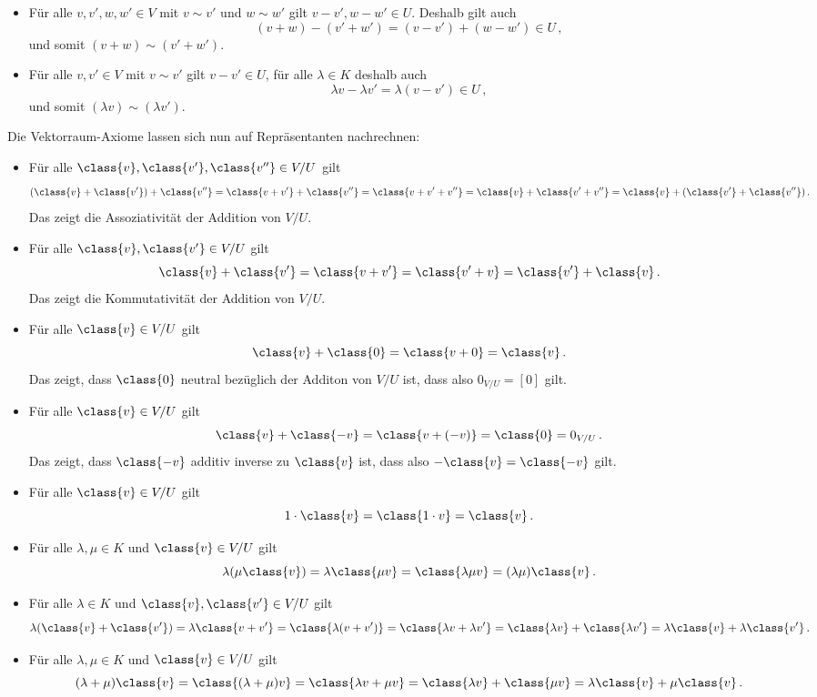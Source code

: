 \begin{itemize}
  \item
    Für alle $v, v', w, w' \in V$ mit $v \sim v'$ und $w \sim w'$ gilt $v - v', w - w' \in U$.
    Deshalb gilt auch
    \[
          (v + w) - (v' + w')
      =   (v - v') + (w - w')
      \in U \,,
    \]
    und somit $(v + w) \sim (v' + w')$.
  \item
    Für alle $v, v' \in V$ mit $v \sim v'$ gilt $v - v' \in U$, für alle $\lambda \in K$ deshalb auch
    \[
          \lambda v - \lambda v'
      =   \lambda (v - v')
      \in U \,,
    \]
    und somit $(\lambda v) \sim (\lambda v')$.
\end{itemize}
Die Vektorraum-Axiome lassen sich nun auf Repräsentanten nachrechnen:
\begin{itemize}
  \item
    Für alle $\class{v}, \class{v'}, \class{v''} \in V\!/U$ gilt
    \[
        (\class{v} + \class{v'}) + \class{v''}
      = \class{v + v'} + \class{v''}
      = \class{v + v' + v''}
      = \class{v} + \class{v' + v''}
      = \class{v} + (\class{v'} + \class{v''}) \,.
    \]
    Das zeigt die Assoziativität der Addition von $V\!/U$.
  \item
    Für alle $\class{v}, \class{v'} \in V\!/U$ gilt
    \[
        \class{v} + \class{v'}
      = \class{v + v'}
      = \class{v' + v}
      = \class{v'} + \class{v} \,.
    \]
    Das zeigt die Kommutativität der Addition von $V\!/U$.
  \item
    Für alle $\class{v} \in V\!/U$ gilt
    \[
        \class{v} + \class{0}
      = \class{v + 0}
      = \class{v} \,.
    \]
    Das zeigt, dass $\class{0}$ neutral bezüglich der Additon von $V\!/U$ ist, dass also $0_{V\!/U} = [0]$ gilt.
  \item
    Für alle $\class{v} \in V\!/U$ gilt
    \[
        \class{v} + \class{-v}
      = \class{v + (-v)}
      = \class{0}
      = 0_{V\!/U} \,.
    \]
    Das zeigt, dass $\class{-v}$ additiv inverse zu $\class{v}$ ist, dass also $-\class{v} = \class{-v}$ gilt.
  \item
    Für alle $\class{v} \in V\!/U$ gilt
    \[
        1 \cdot \class{v}
      = \class{1 \cdot v}
      = \class{v} \,.
    \]
  \item
    Für alle $\lambda, \mu \in K$ und $\class{v} \in V\!/U$ gilt
    \[
        \lambda (\mu \class{v})
      = \lambda \class{\mu v}
      = \class{\lambda \mu v}
      = (\lambda \mu) \class{v} \,.
    \]
  \item
    Für alle $\lambda \in K$ und $\class{v}, \class{v'} \in V\!/U$ gilt
    \[
        \lambda (\class{v} + \class{v'})
      = \lambda \class{v + v'}
      = \class{\lambda (v + v')}
      = \class{\lambda v + \lambda v'}
      = \class{\lambda v} + \class{\lambda v'}
      = \lambda \class{v} + \lambda \class{v'} \,.
    \]
  \item
    Für alle $\lambda, \mu \in K$ und $\class{v} \in V\!/U$ gilt
    \[
        (\lambda + \mu) \class{v}
      = \class{(\lambda + \mu) v}
      = \class{\lambda v + \mu v}
      = \class{\lambda v} + \class{\mu v}
      = \lambda \class{v} + \mu \class{v} \,.
    \]
\end{itemize}
